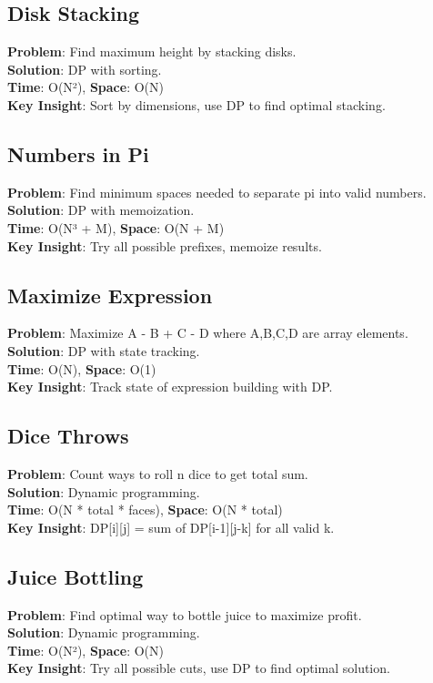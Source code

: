 \documentclass{report}
\begin{document}
\subsection{Disk Stacking}
\textbf{Problem}: Find maximum height by stacking disks.\\
\textbf{Solution}: DP with sorting.\\
\textbf{Time}: O(N²), \textbf{Space}: O(N)\\
\textbf{Key Insight}: Sort by dimensions, use DP to find optimal stacking.

\subsection{Numbers in Pi}
\textbf{Problem}: Find minimum spaces needed to separate pi into valid numbers.\\
\textbf{Solution}: DP with memoization.\\
\textbf{Time}: O(N³ + M), \textbf{Space}: O(N + M)\\
\textbf{Key Insight}: Try all possible prefixes, memoize results.

\subsection{Maximize Expression}
\textbf{Problem}: Maximize A - B + C - D where A,B,C,D are array elements.\\
\textbf{Solution}: DP with state tracking.\\
\textbf{Time}: O(N), \textbf{Space}: O(1)\\
\textbf{Key Insight}: Track state of expression building with DP.

\subsection{Dice Throws}
\textbf{Problem}: Count ways to roll n dice to get total sum.\\
\textbf{Solution}: Dynamic programming.\\
\textbf{Time}: O(N * total * faces), \textbf{Space}: O(N * total)\\
\textbf{Key Insight}: DP[i][j] = sum of DP[i-1][j-k] for all valid k.

\subsection{Juice Bottling}
\textbf{Problem}: Find optimal way to bottle juice to maximize profit.\\
\textbf{Solution}: Dynamic programming.\\
\textbf{Time}: O(N²), \textbf{Space}: O(N)\\
\textbf{Key Insight}: Try all possible cuts, use DP to find optimal solution.
\end{document}
